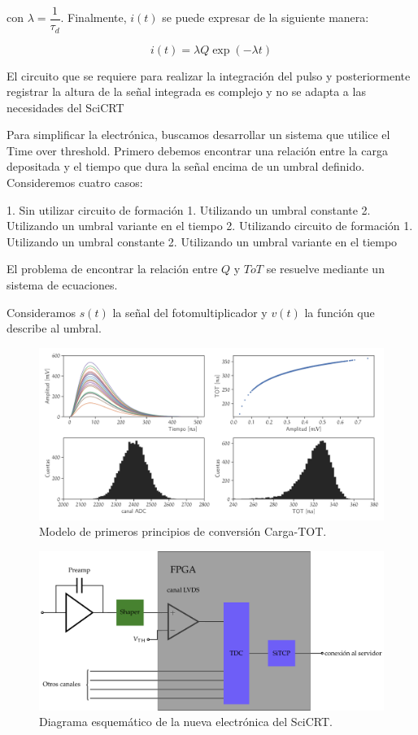 con $\lambda=\dfrac{1}{\tau_{d}}$. Finalmente, $i\left(t\right)$ se puede expresar de la siguiente manera:

\begin{equation}
i\left(t\right)=\lambda Q \exp\left(-\lambda t\right)
\end{equation}

El circuito que se requiere para realizar la integración del pulso y posteriormente registrar la altura de la señal integrada es complejo y no se adapta a las necesidades del SciCRT

Para simplificar la electrónica, buscamos desarrollar un sistema que utilice el Time over threshold. Primero debemos encontrar una relación entre la carga depositada y el tiempo que dura la señal encima de un umbral definido. Consideremos cuatro casos:

1. Sin utilizar circuito de formación
    1. Utilizando un umbral constante
    2. Utilizando un umbral variante en el tiempo
2. Utilizando circuito de formación
    1. Utilizando un umbral constante
    2. Utilizando un umbral variante en el tiempo

El problema de encontrar la relación entre $Q$ y $ToT$ se resuelve mediante un sistema de ecuaciones.

Consideramos $s\left(t\right)$ la señal del fotomultiplicador y $v\left(t\right)$ la función que describe al umbral.

\begin{figure}
        \centering
        \includegraphics[width=\textwidth]{TOT-model.pdf}
        \caption{Modelo de primeros principios de conversión Carga-TOT.}
        \label{fig:tot-model}
\end{figure}

\begin{figure}
        \centering
        \includegraphics[width=\textwidth]{nfeb-prot.pdf}
        \caption{Diagrama esquemático de la nueva electrónica del SciCRT.}
        \label{fig:nfeb-prot}
\end{figure}


